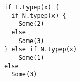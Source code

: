 \begin{lstlisting}[style=scalaioScala]
if I.typep(x) {
  if N.typep(x) {
    Some(2)
  else
    Some(3)
} else if N.typep(x)
    Some(1)
else
  Some(3)
\end{lstlisting}
